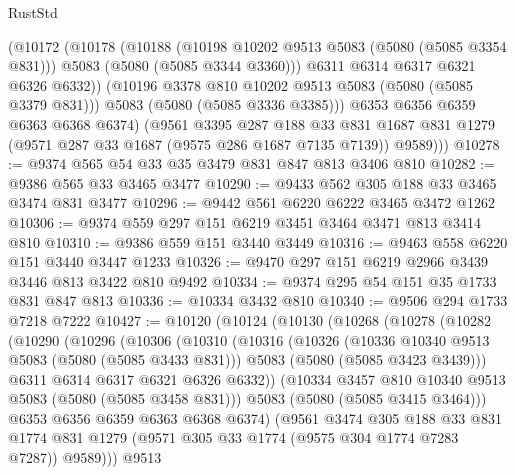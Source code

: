 \begin{lexlean}{RustStd}
\begin{coremodule}
{\begin{coremodule}
{{{{{            (@10172
              (@10178
                (@10188
                  (@10198 @10202 @9513 @5083 (@5080 (@5085 @3354 @831)))
                  @5083
                  (@5080 (@5085 @3344 @3360)))
                @6311
                @6314
                @6317
                @6321
                @6326
                @6332))
            (@10196 @3378 @810 @10202 @9513 @5083 (@5080 (@5085 @3379 @831)))
            @5083
            (@5080 (@5085 @3336 @3385)))
          @6353
          @6356
          @6359
          @6363
          @6368
          @6374)
        (@9561
          @3395
          @287
          @188
          @33
          @831
          @1687
          @831
          @1279
          (@9571 @287 @33 @1687 (@9575 @286 @1687 @7135 @7139))
          @9589)))
@10278 := @9374 @565 @54 @33 @35 @3479 @831 @847 @813 @3406 @810
@10282 := @9386 @565 @33 @3465 @3477
@10290 := @9433 @562 @305 @188 @33 @3465 @3474 @831 @3477
@10296 := @9442 @561 @6220 @6222 @3465 @3472 @1262
@10306 := @9374 @559 @297 @151 @6219 @3451 @3464 @3471 @813 @3414 @810
@10310 := @9386 @559 @151 @3440 @3449
@10316 := @9463 @558 @6220 @151 @3440 @3447 @1233
@10326 := @9470 @297 @151 @6219 @2966 @3439 @3446 @813 @3422 @810 @9492
@10334 := @9374 @295 @54 @151 @35 @1733 @831 @847 @813
@10336 := @10334 @3432 @810
@10340 := @9506 @294 @1733 @7218 @7222
@10427 := @10120
    (@10124
      (@10130
        (@10268
          (@10278
            (@10282
              (@10290
                (@10296
                  (@10306
                    (@10310
                      (@10316
                        (@10326
                          (@10336 @10340 @9513 @5083 (@5080 (@5085 @3433 @831)))
                          @5083
                          (@5080 (@5085 @3423 @3439)))
                        @6311
                        @6314
                        @6317
                        @6321
                        @6326
                        @6332))
                    (@10334 @3457 @810 @10340 @9513 @5083 (@5080 (@5085 @3458 @831)))
                    @5083
                    (@5080 (@5085 @3415 @3464)))
                  @6353
                  @6356
                  @6359
                  @6363
                  @6368
                  @6374)
                (@9561
                  @3474
                  @305
                  @188
                  @33
                  @831
                  @1774
                  @831
                  @1279
                  (@9571 @305 @33 @1774 (@9575 @304 @1774 @7283 @7287))
                  @9589)))
            @9513
}}}}}
\end{coremodule}}
\end{coremodule}
\end{lexlean}
